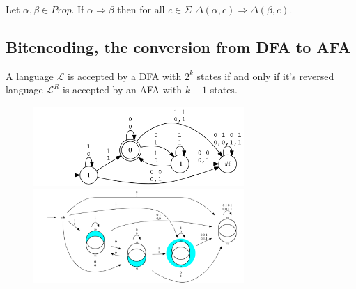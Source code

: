 \begin{lemma}
Let \(\alpha, \beta \in \mathit{Prop} \). If \( \alpha \Rightarrow \beta \) then for all
\( c \in \Sigma \) \( \Delta(\alpha, c) \Rightarrow \Delta(\beta, c) \).
\end{lemma}

\subsection{Bitencoding, the conversion from DFA to AFA}
\begin{theorem}
 A language \( \mathcal{L} \) is accepted by a DFA with
\( 2^k \) states if and only if it's reversed language \( \mathcal{L}^R \) is
accepted by an AFA with \( k + 1 \) states.
\end{theorem}
\begin{example}
  \begin{figure}
    \includegraphics[width=8cm]{images/dfa}
    \includegraphics[width=8cm]{images/afa}
  \end{figure}
\end{example}
